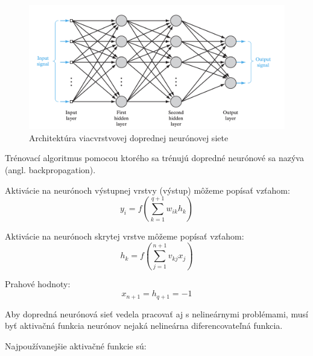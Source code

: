 \begin{figure}[H]
	\centering
	\includegraphics[width=\textwidth]{assets/mlp}
	\caption{Architektúra viacvrstvovej doprednej neurónovej siete \protect\cite{haykin2009neural}}
\end{figure}

Trénovací algoritmus pomocou ktorého sa trénujú dopredné neurónové sa nazýva  (angl. backpropagation).

Aktivácie na neurónoch výstupnej vrstvy (výstup) môžeme popísať vzťahom:
\begin{equation}
y_i = f(\sum_{k=1}^{q+1}w_{ik}h_{k})
\end{equation}

Aktivácie na neurónoch skrytej vrstve môžeme popísať vzťahom:
\begin{equation}
	h_{k} = f(\sum_{j=1}^{n+1}v_{kj}x_{j})
\end{equation}

Prahové hodnoty:
\begin{equation}
	x_{n+1} = h_{q+1} = -1
\end{equation}

Aby dopredná neurónová sieť vedela pracovať aj s nelineárnymi problémami, musí byť aktivačná funkcia neurónov
nejaká nelineárna diferencovateľná funkcia. 

Najpoužívanejšie aktivačné funkcie sú:

